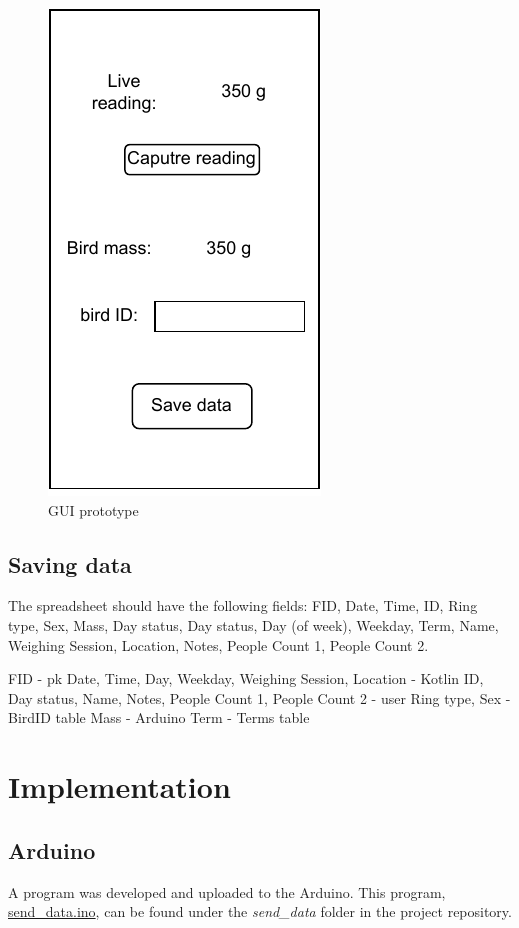 \documentclass[class=report,11pt,crop=false]{standalone}
\begin{document}
		\begin{figure}[h!]
			\centering
			\includegraphics[scale=1]{"Figures/GUI prototype"}
			\caption{GUI prototype}
			\label{fig:gui-prototype}
		\end{figure}
		
		\subsection{Saving data}
		
		
		The spreadsheet should have the following fields: FID, Date, Time, ID, Ring type, Sex, Mass, Day status, Day status, Day (of week), Weekday, Term, Name, Weighing Session, Location, Notes, People Count 1, People Count 2.
		
		FID - pk
		Date, Time, Day, Weekday, Weighing Session, Location - Kotlin
		ID, Day status, Name, Notes, People Count 1, People Count 2 - user
		Ring type, Sex - BirdID table
		Mass - Arduino
		Term - Terms table
		
	
	\section{Implementation}
	
		\subsection{Arduino}
		A program was developed and uploaded to the Arduino. This program, \href{https://github.com/karanimaan/EEE4113F-Project--Group-26/blob/main/send_data/send_data.ino}{send\_data.ino}, can be found under the \textit{send\_data} folder in the project repository.
	
\end{document}
